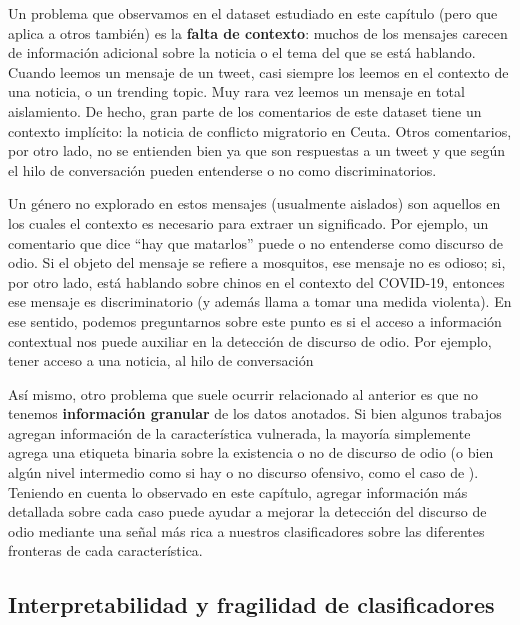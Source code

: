 
Un problema que observamos en el dataset estudiado en este capítulo (pero que aplica a otros también) es la \textbf{falta de contexto}: muchos de los mensajes carecen de información adicional sobre la noticia o el tema del que se está hablando. Cuando leemos un mensaje de un tweet, casi siempre los leemos en el contexto de una noticia, o un trending topic. Muy rara vez leemos un mensaje en total aislamiento. De hecho, gran parte de los comentarios de este dataset tiene un contexto implícito: la noticia de conflicto migratorio en Ceuta. Otros comentarios, por otro lado, no se entienden bien ya que son respuestas a un tweet y que según el hilo de conversación pueden entenderse o no como discriminatorios.

Un género no explorado en estos mensajes (usualmente aislados) son aquellos en los cuales el contexto es necesario para extraer un significado. Por ejemplo, un comentario que dice ``hay que matarlos'' puede o no entenderse como discurso de odio. Si el objeto del mensaje se refiere a mosquitos, ese mensaje no es odioso; si, por otro lado, está hablando sobre chinos en el contexto del COVID-19, entonces ese mensaje es discriminatorio (y además llama a tomar una medida violenta). En ese sentido, podemos preguntarnos sobre este punto es si el acceso a información contextual nos puede auxiliar en la detección de discurso de odio. Por ejemplo, tener acceso a una noticia, al hilo de conversación

Así mismo, otro problema que suele ocurrir relacionado al anterior es que no tenemos \textbf{información granular} de los datos anotados. Si bien algunos trabajos agregan información de la característica vulnerada, la mayoría simplemente agrega una etiqueta binaria sobre la existencia o no de discurso de odio (o bien algún nivel intermedio como si hay o no discurso ofensivo, como el caso de \citet{Davidson2017AutomatedHS}). Teniendo en cuenta lo observado en este capítulo, agregar información más detallada sobre cada caso puede ayudar a mejorar la detección del discurso de odio mediante una señal más rica a nuestros clasificadores sobre las diferentes fronteras de cada característica.

\subsection{Interpretabilidad y fragilidad de clasificadores}


